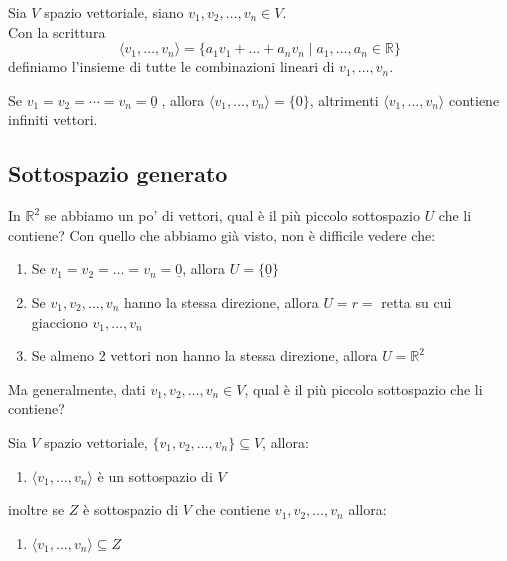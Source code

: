 \documentclass[
  a4paper,
]{article}
\providecommand{\tightlist}{%
  \setlength{\itemsep}{0pt}\setlength{\parskip}{0pt}}
\providecommand{\tightlist}{}
\begin{document}
\begin{definitionbox}
Sia \(V\) spazio vettoriale, siano \(v_1, v_2, \dots, v_n \in V\).\\
Con la scrittura \[
\langle v_1, \dots, v_n \rangle = \{a_1v_1 + \dots + a_n v_n \mid a_1, \dots, a_n \in \mathbb{R}\}
\] definiamo l'insieme di tutte le combinazioni lineari di
\(v_1, \dots , v_n\).
\end{definitionbox}

\begin{observationbox}
Se \(v_1=v_2=\cdots=v_n=\underline{0}\;\), allora
\(\langle v_1,\ldots,v_n\rangle=\{0\}\), altrimenti
\(\langle v_1,\ldots,v_n\rangle\) contiene infiniti vettori.
\end{observationbox}

\hypertarget{sottospazio-generato}{%
\subsection{Sottospazio generato}\label{sottospazio-generato}}

In \(\mathbb{R}^2\) se abbiamo un po' di vettori, qual è il più piccolo
sottospazio \(U\) che li contiene? Con quello che abbiamo già visto, non
è difficile vedere che:

\begin{enumerate}
\def\labelenumi{\arabic{enumi}.}
\tightlist
\item
  Se \(v_1 = v_2 = \dots = v_n = \underline 0\), allora
  \(U = \{\underline 0\}\)
\item
  Se \(v_1, v_2, \dots, v_n\) hanno la stessa direzione, allora
  \(U = r =\) retta su cui giacciono \(v_1, \dots, v_n\)\\
\item
  Se almeno 2 vettori non hanno la stessa direzione, allora
  \(U = \mathbb{R}^2\)
\end{enumerate}

Ma generalmente, dati \(v_1, v_2, \dots, v_n \in V\), qual è il più
piccolo sottospazio che li contiene?

\begin{propositionbox}
Sia \(V\) spazio vettoriale, \(\{v_1, v_2, \dots, v_n \} \subseteq V\),
allora:

\begin{enumerate}
\def\labelenumi{\arabic{enumi}.}
\tightlist
\item
  \(\langle v_1, \dots, v_n \rangle\) è un sottospazio di \(V\)
\end{enumerate}

inoltre se \(Z\) è sottospazio di \(V\) che contiene
\(v_1, v_2, \dots, v_n\) allora:

\begin{enumerate}
\def\labelenumi{\arabic{enumi}.}
\setcounter{enumi}{1}
\tightlist
\item
  \(\langle v_1, \dots, v_n \rangle \subseteq Z\)
\end{enumerate}
\end{propositionbox}
\end{document}
